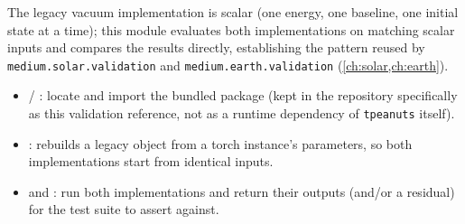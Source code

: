 \begin{implbox}
The legacy vacuum implementation is scalar (one energy, one baseline, one
initial state at a time); this module evaluates both implementations on
matching scalar inputs and compares the results directly, establishing the
pattern reused by \texttt{medium.solar.validation} and
\texttt{medium.earth.validation} (\cref{ch:solar,ch:earth}).
\begin{itemize}
  \item {} / :
    locate and import the bundled  package (kept in the
    repository specifically as this validation reference, not as a runtime
    dependency of \texttt{tpeanuts} itself).
  \item {}: rebuilds a legacy
     object from a torch  instance's
    parameters, so both implementations start from identical inputs.
  \item {} and
    :
    run both implementations and return their outputs (and/or a residual)
    for the test suite to assert against.
\end{itemize}
\end{implbox}
